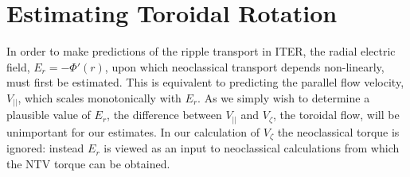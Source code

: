 \documentclass{article}
\numberwithin{figure}{section}
\numberwithin{equation}{section}
\begin{document}
\FloatBarrier

\section{Estimating Toroidal Rotation}\label{rotation}

In order to make predictions of the ripple transport in ITER, the radial electric field, $E_r = - \Phi'(r) $, upon which neoclassical transport depends non-linearly, must first be estimated. This is equivalent to predicting the parallel flow velocity, $V_{||}$, which scales monotonically with $E_r$.  As we simply wish to determine a plausible value of $E_r$, the difference between $V_{||}$ and $V_{\zeta}$, the toroidal flow, will be unimportant for our estimates. In our calculation of $V_{\zeta}$ the neoclassical torque is ignored: instead $E_r$ is viewed as an input to neoclassical calculations from which the NTV torque can be obtained. 
\end{document}
